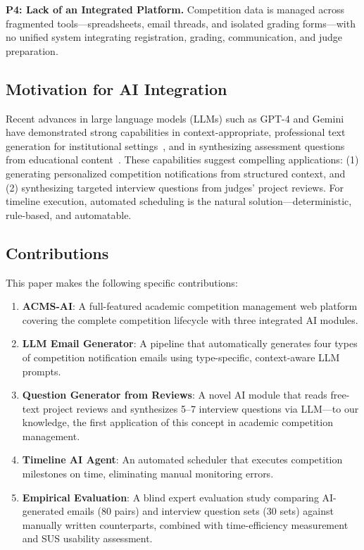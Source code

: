 \documentclass[runningheads]{llncs}
\begin{document}
\textbf{P4: Lack of an Integrated Platform.} Competition data is managed across fragmented tools---spreadsheets, email threads, and isolated grading forms---with no unified system integrating registration, grading, communication, and judge preparation.

\subsection{Motivation for AI Integration}

Recent advances in large language models (LLMs) such as GPT-4 and Gemini have demonstrated strong capabilities in context-appropriate, professional text generation for institutional settings~\cite{ref_advising_llm}, and in synthesizing assessment questions from educational content~\cite{ref_quiz_gen}. These capabilities suggest compelling applications: (1) generating personalized competition notifications from structured context, and (2) synthesizing targeted interview questions from judges' project reviews. For timeline execution, automated scheduling is the natural solution---deterministic, rule-based, and automatable.

\subsection{Contributions}

This paper makes the following specific contributions:

\begin{enumerate}
  \item \textbf{ACMS-AI}: A full-featured academic competition management web platform covering the complete competition lifecycle with three integrated AI modules.
  \item \textbf{LLM Email Generator}: A pipeline that automatically generates four types of competition notification emails using type-specific, context-aware LLM prompts.
  \item \textbf{Question Generator from Reviews}: A novel AI module that reads free-text project reviews and synthesizes 5--7 interview questions via LLM---to our knowledge, the first application of this concept in academic competition management.
  \item \textbf{Timeline AI Agent}: An automated scheduler that executes competition milestones on time, eliminating manual monitoring errors.
  \item \textbf{Empirical Evaluation}: A blind expert evaluation study comparing AI-generated emails (80 pairs) and interview question sets (30 sets) against manually written counterparts, combined with time-efficiency measurement and SUS usability assessment.
\end{enumerate}
\end{document}
